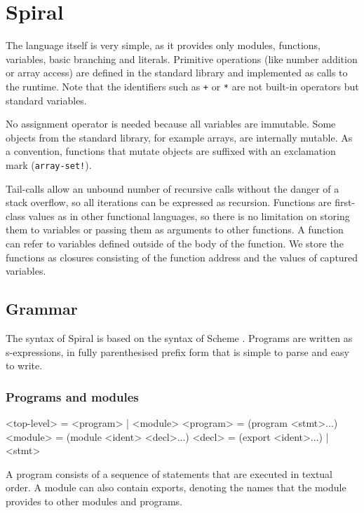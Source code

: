 \chapter{Spiral}

The language itself is very simple, as it provides only modules, functions,
variables, basic branching and literals. Primitive operations (like number
addition or array access) are defined in the standard library and implemented as
calls to the runtime. Note that the identifiers such as \texttt{+} or \texttt{*}
are not built-in operators but standard variables.

No assignment operator is needed because all variables are immutable. Some
objects from the standard library, for example arrays, are internally mutable.
As a convention, functions that mutate objects are suffixed with an exclamation
mark (\texttt{array-set!}).

Tail-calls allow an unbound number of recursive calls without the danger of
a stack overflow, so all iterations can be expressed as recursion. Functions are
first-class values as in other functional languages, so there is no limitation
on storing them to variables or passing them as arguments to other functions. A
function can refer to variables defined outside of the body of the function.
We store the functions as closures consisting of the function address and the
values of captured variables.

\section{Grammar}

The syntax of Spiral is based on the syntax of Scheme \cite{scheme7}. Programs
are written as s-expressions, in fully parenthesised prefix form that is simple
to parse and easy to write.

\subsection{Programs and modules}

\begin{ttcode}
<top-level>   = <program> | <module>
<program>     = (program <stmt>...)
<module>      = (module <ident> <decl>...)
<decl>        = (export <ident>...) | <stmt>
\end{ttcode}

A program consists of a sequence of statements that are executed in textual
order. A module can also contain exports, denoting the names that the module
provides to other modules and programs.

